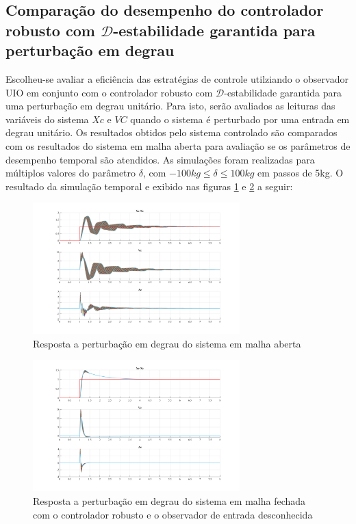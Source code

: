 \subsection{Comparação do desempenho do controlador robusto com \( \mathcal{D}\)-estabilidade garantida para perturbação em degrau}
Escolheu-se avaliar a eficiência das estratégias de controle utilziando o observador UIO em conjunto com o controlador robusto com \( \mathcal{D}\)-estabilidade garantida para uma perturbação em degrau unitário. Para isto, serão avaliados as leituras das variáveis do sistema $Xc$ e $VC$ quando o sistema é perturbado por uma entrada em degrau unitário. Os resultados obtidos pelo sistema controlado são comparados com os resultados do sistema em malha aberta para avaliação se os parâmetros de desempenho temporal são atendidos. As simulações foram realizadas para múltiplos valores do parâmetro $\delta$, com $-100kg\leq \delta\leq 100kg$ em passos de 5kg. O resultado da simulação temporal e exibido nas figuras \ref{fig:eval_cntrol_OPEN_step} e \ref{fig:eval_cntrol_UIO_step}  a seguir:

\FloatBarrier
\begin{figure}[htbp]
    \begin{centering}
    \includegraphics[width=8cm]{img/eval_cntrol_OPEN_step.png} 
    \caption{Resposta a perturbação em degrau do sistema em malha aberta}
    \label{fig:eval_cntrol_OPEN_step}
    \end{centering}
\end{figure}
\FloatBarrier

\FloatBarrier
\begin{figure}[htbp]
    \begin{centering}
    \includegraphics[width=8cm]{img/eval_cntrol_UIO_step.png} 
    \caption{Resposta a perturbação em degrau do sistema em malha fechada com o controlador robusto e o observador de entrada desconhecida}
    \label{fig:eval_cntrol_UIO_step}
    \end{centering}
\end{figure}
\FloatBarrier

